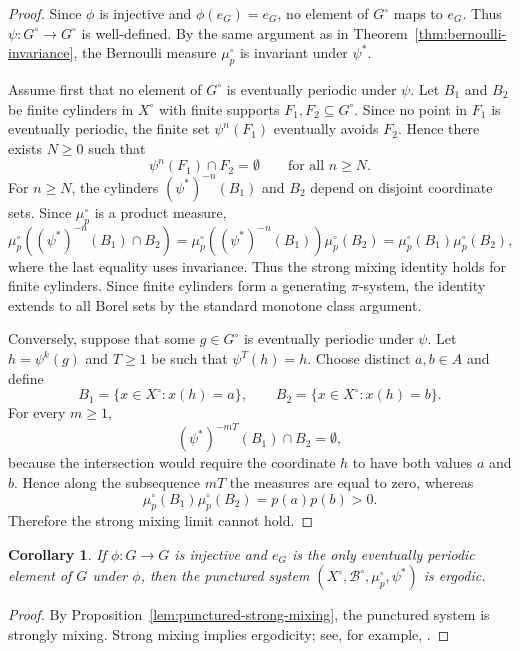\documentclass[12pt,a4paper]{article}
\newtheorem{corollary}[theorem]{Corollary}
\theoremstyle{definition}
\theoremstyle{remark}
\newcommand{\calB}{\mathcal{B}}
\begin{document}
\begin{proof}
Since $\phi$ is injective and $\phi(e_G)=e_G$, no element of $G^\circ$ maps to $e_G$. Thus $\psi:G^\circ\to G^\circ$ is well-defined. By the same argument as in Theorem~\ref{thm:bernoulli-invariance}, the Bernoulli measure $\mu_p^\circ$ is invariant under $\psi^*$. 

Assume first that no element of $G^\circ$ is eventually periodic under $\psi$. Let $B_1$ and $B_2$ be finite cylinders in $X^\circ$ with finite supports $F_1,F_2\subseteq G^\circ$. Since no point in $F_1$ is eventually periodic, the finite set $\psi^n(F_1)$ eventually avoids $F_2$. Hence there exists $N\geq 0$ such that
\[
\psi^n(F_1)\cap F_2=\emptyset
\qquad\text{for all }n\geq N.
\]
For $n\geq N$, the cylinders $(\psi^*)^{-n}(B_1)$ and $B_2$ depend on disjoint coordinate sets. Since $\mu_p^\circ$ is a product measure,
\[
\mu_p^\circ((\psi^*)^{-n}(B_1)\cap B_2)
=\mu_p^\circ((\psi^*)^{-n}(B_1))\mu_p^\circ(B_2)
=\mu_p^\circ(B_1)\mu_p^\circ(B_2),
\]
where the last equality uses invariance. Thus the strong mixing identity holds for finite cylinders. Since finite cylinders form a generating $\pi$-system, the identity extends to all Borel sets by the standard monotone class argument.

Conversely, suppose that some $g\in G^\circ$ is eventually periodic under $\psi$. Let $h=\psi^k(g)$ and $T\geq 1$ be such that $\psi^T(h)=h$. Choose distinct $a,b\in A$ and define
\[
B_1=\{x\in X^\circ:x(h)=a\},
\qquad
B_2=\{x\in X^\circ:x(h)=b\}.
\]
For every $m\geq 1$,
\[
(\psi^*)^{-mT}(B_1)\cap B_2=\emptyset,
\]
because the intersection would require the coordinate $h$ to have both values $a$ and $b$. Hence along the subsequence $mT$ the measures are equal to zero, whereas
\[
\mu_p^\circ(B_1)\mu_p^\circ(B_2)=p(a)p(b)>0.
\]
Therefore the strong mixing limit cannot hold.
\end{proof}

\begin{corollary}\label{cor:punctured-ergodicity}
If $\phi:G\to G$ is injective and $e_G$ is the only eventually periodic element of $G$ under $\phi$, then the punctured system $(X^\circ,\calB^\circ,\mu_p^\circ,\psi^*)$ is ergodic.
\end{corollary}

\begin{proof}
By Proposition~\ref{lem:punctured-strong-mixing}, the punctured system is strongly mixing. Strong mixing implies ergodicity; see, for example, \cite{hawkins2021ergodic}.
\end{proof}
\end{document}
